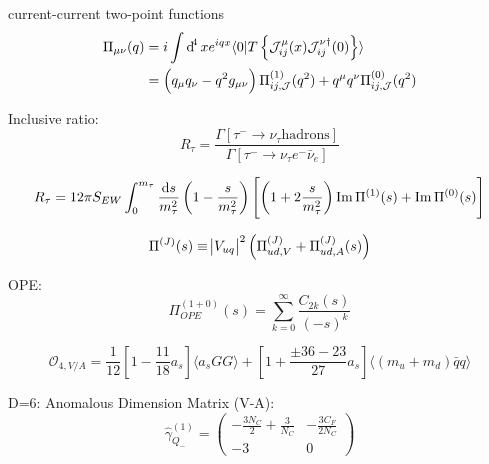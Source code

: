 \documentclass{article}
\begin{document}
  current-current two-point functions
  \begin{equation}
    \begin{split}
      \Pi_{\mu\nu}(q) &= i \int \dif^4 x e^{iqx} \langle  0 | T \left\{ \mathcal{J}_{ij}^{\mu}(x) \mathcal{J}_{ij}^{\nu\dagger}(0) \right\} \rangle \\
      &= \left(q_\mu q_\nu - q^2 g_{\mu\nu}\right) \Pi_{ij,\mathcal{J}}^{(1)}(q^2) + q^\mu q^\nu \Pi_{ij,\mathcal{J}}^{(0)} (q^2) 
    \end{split}
  \end{equation}
  
  Inclusive ratio:
  \begin{equation}
    R_\tau = \frac{\Gamma [ \tau^- \to \nu_\tau \text{hadrons}]}{\Gamma [ \tau^- \to \nu_\tau e^- \bar\nu_e]}
  \end{equation}

  \begin{equation}
    R_{\tau} = 12 \pi S_{EW} \int_0^{m_\tau} \frac{\dif s}{m_\tau^2} \left( 1 - \frac{s}{m_\tau^2}\right) \left[ \left( 1+2\frac{s}{m_\tau^2} \right) \operatorname{Im} \Pi^{(1)}(s) + \operatorname{Im} \Pi^{(0)}(s)\right]
  \end{equation}

  \begin{equation}
    \Pi^{(J)}(s) \equiv \envert{V_{uq}}^2 \left( \Pi_{ud,V}^{(J)} + \Pi_{ud,A}^{(J)}(s) \right)
  \end{equation}
  
  OPE:
  \begin{equation}
    \Pi_{OPE}^{(1+0)}(s) = \sum_{k=0}^{\infty}\frac{C_{2k}(s)}{(-s)^k}
  \end{equation}

  \begin{equation}
    \mathcal{O}_{4,V/A} = \frac{1}{12}\left[ 1 - \frac{11}{18} a_s \right] \langle a_s GG \rangle + \left[ 1 + \frac{\pm 36 - 23}{27} a_s \right] \langle (m_u + m_d) \bar q q \rangle
  \end{equation}

  D=6:
  Anomalous Dimension Matrix (V-A):
  \begin{equation}
    \hat \gamma^{(1)}_{Q_-} = 
    \begin{pmatrix}
      -\frac{3N_C}{2}+\frac{3}{N_C} & -\frac{3C_F}{2N_C} \\
      -3 & 0
    \end{pmatrix}
  \end{equation}
\end{document}
